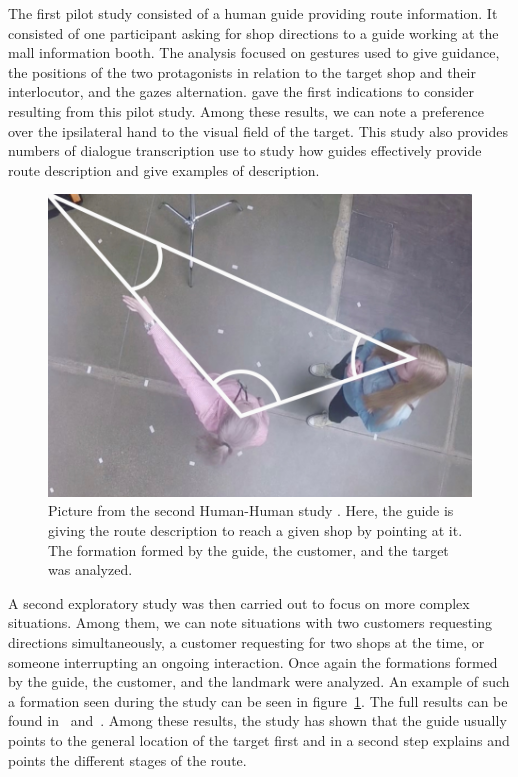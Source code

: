 The first pilot study consisted of a human guide providing route information. It consisted of one participant asking for shop directions to a guide working at the mall information booth. The analysis focused on gestures used to give guidance, the positions of the two protagonists in relation to the target shop and their interlocutor, and the gazes alternation. \cite{belhassein_2017_human} gave the first indications to consider resulting from this pilot study. Among these results, we can note a preference over the ipsilateral hand to the visual field of the target. This study also provides numbers of dialogue transcription use to study how guides effectively provide route description and give examples of description.

\begin{figure}[ht!]
\centering
\includegraphics[scale=0.40]{figures/chapter8/human_guide.png}
\caption{\label{fig:chap8_human_guide} Picture from the second Human-Human study \cite{belhassein_2017_human}. Here, the guide is giving the route description to reach a given shop by pointing at it. The formation formed by the guide, the customer, and the target was analyzed. }
\end{figure}

A second exploratory study was then carried out to focus on more complex situations. Among them, we can note situations with two customers requesting directions simultaneously, a customer requesting for two shops at the time, or someone interrupting an ongoing interaction. Once again the formations formed by the guide, the customer, and the landmark were analyzed. An example of such a formation seen during the study can be seen in figure~\ref{fig:chap8_human_guide}. The full results can be found in~\cite{Heikkilae_2018_where} and~\cite{heikkilae_2019_should}. Among these results, the study has shown that the guide usually points to the general location of the target first and in a second step explains and points the different stages of the route.

